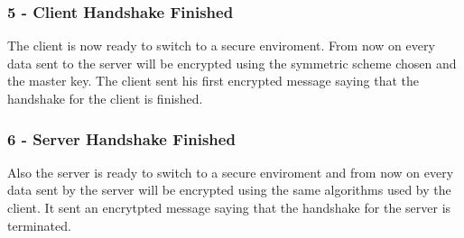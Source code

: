 \subsubsection{5 - Client Handshake Finished}
The client is now ready to switch to a secure enviroment. From now on every data sent to the server will be encrypted using the symmetric scheme chosen and the master key. The client sent his first encrypted message saying that the handshake for the client is finished.

\subsubsection{6 - Server Handshake Finished}
Also the server is ready to switch to a secure enviroment and from now on every data sent by the server will be encrypted using the same algorithms used by the client. It sent an encrytpted message saying that the handshake for the server is terminated.
